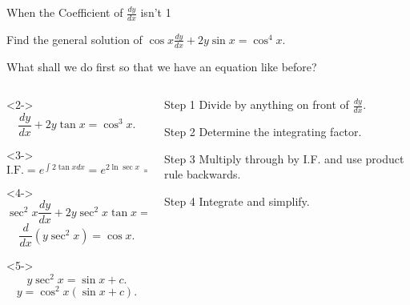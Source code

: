 \documentclass[8pt]{beamer}
\begin{document}
\begin{frame}[shrink]{When the Coefficient of $\frac{dy}{dx}$ isn't 1}
	\begin{problem}
		Find the general solution of $\cos x \frac{dy}{dx}+ 2y\sin x = \cos^4 x.$
	\end{problem}

	What shall we do first so that we have an equation like before? 

	\begin{columns}[T]
	\begin{column}{.6\linewidth}
	\begin{solution}<2->
		\[
		\frac{dy}{dx}+2y \tan x = \cos^3 x
		.\] 
	\end{solution}

	\begin{solution}<3->
		\[
			\text{I.F.}= e^{\int 2 \tan x dx}= e ^{2 \ln \sec x}=\sec^2x
		.\] 
	\end{solution}
	\begin{solution}<4->
		\[
		\sec^2 x \frac{dy}{dx} + 2y \sec^2x \tan x = \cos x 
		.\] 
		\[
			\frac{d}{dx}(y \sec^2 x)=\cos x
		.\] 
	\end{solution}
	\begin{solution}<5->
		\[
		y \sec^2x =\sin x +c
		.\] 
		\[
			y= \cos^2x(\sin x +c)
		.\] 
	\end{solution}
	\end{column}
	\begin{column}{.4\linewidth}
		\begin{block}{Step 1}
		Divide by anything on front of $\frac{dy}{dx}$.
	\end{block}
	\begin{block}{Step 2}
		Determine the integrating factor.
	\end{block}
	\begin{block}{Step 3}
		Multiply through by I.F. and use product rule backwards.
		
	\end{block}
	\begin{block}{Step 4}
		Integrate and simplify.
	\end{block}
	\end{column}
	\end{columns}


\end{frame}
\end{document}
